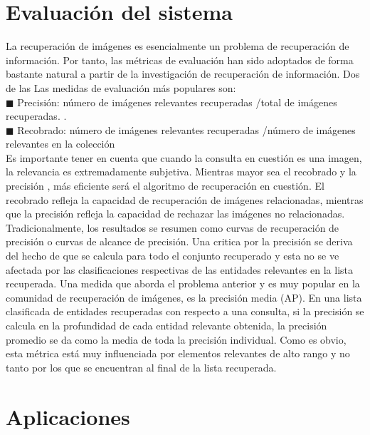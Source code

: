 \documentclass{llncs}
\begin{document}
\chapter*{Evaluación del sistema}


La recuperación de imágenes es esencialmente un problema de recuperación de información. Por tanto, 
las métricas de evaluación han sido adoptados de forma bastante natural a partir de la investigación de 
recuperación de información. Dos de las Las medidas de evaluación más populares son:\\
$\blacksquare$ Precisión:  n\'umero de im\'agenes relevantes  recuperadas /total de im\'agenes recuperadas.
.\\
$\blacksquare$ Recobrado:  n\'umero de im\'agenes relevantes  recuperadas /n\'umero de im\'agenes relevantes en la colecci\'on\\

Es importante tener en cuenta que cuando la consulta en cuestión es una imagen, la relevancia es extremadamente subjetiva. 
Mientras mayor sea el recobrado y la precisi\'on , m\'as eficiente ser\'a el algoritmo de recuperaci\'on en cuesti\'on.
El recobrado refleja la capacidad de recuperaci\'on de im\'agenes relacionadas, mientras que la precisi\'on refleja la
capacidad de rechazar las im\'agenes no relacionadas.
Tradicionalmente, los resultados se resumen como curvas de recuperación de precisión o curvas de alcance de precisión. 
Una critica por la precisión se deriva del hecho de que se calcula para todo el conjunto recuperado y esta no se ve afectada 
por las clasificaciones respectivas de las entidades relevantes en la lista recuperada. Una medida que aborda el problema 
anterior y es muy popular en la comunidad de recuperación de imágenes, es la precisión media (AP). En una lista clasificada 
de entidades recuperadas con respecto a una consulta, si la precisión se calcula en la profundidad de cada entidad relevante 
obtenida, la precisión promedio se da como la media de toda la precisión individual. Como es obvio, esta métrica está muy 
influenciada por elementos relevantes de alto rango y no tanto por los que se encuentran al final de la lista recuperada.


\chapter*{Aplicaciones}
\end{document}
